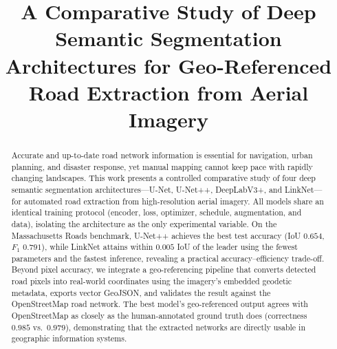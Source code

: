 \documentclass[conference]{IEEEtran}
\begin{document}
\newif\ifanon
\anontrue

\title{A Comparative Study of Deep Semantic Segmentation Architectures for
Geo-Referenced Road Extraction from Aerial Imagery}

\ifanon
\author{
}
\else
\author{
\IEEEauthorblockN{Abhinav Shukla}
\IEEEauthorblockA{\textit{Dept. of Computer Science and Engineering}\\
\textit{Amity School of Engineering and Technology}\\
\textit{Amity University Uttar Pradesh, Lucknow Campus, India}\\
abhinav24shukla08@gmail.com}
\and
\IEEEauthorblockN{Dr. Sachin Kumar}
\IEEEauthorblockA{\textit{Dept. of Computer Science and Engineering}\\
\textit{Amity School of Engineering and Technology}\\
\textit{Amity University Uttar Pradesh, Lucknow Campus, India}\\
skumar3@lko.amity.edu}
}
\fi

\maketitle

\begin{abstract}
Accurate and up-to-date road network information is essential for navigation,
urban planning, and disaster response, yet manual mapping cannot keep pace with
rapidly changing landscapes. This work presents a controlled comparative study
of four deep semantic segmentation architectures---U-Net, U-Net++, DeepLabV3+,
and LinkNet---for automated road extraction from high-resolution aerial
imagery. All models share an identical training protocol (encoder, loss,
optimizer, schedule, augmentation, and data), isolating the architecture as the
only experimental variable. On the Massachusetts Roads benchmark, U-Net++
achieves the best test accuracy (IoU $0.654$, $F_1$ $0.791$), while LinkNet
attains within $0.005$ IoU of the leader using the fewest parameters and the
fastest inference, revealing a practical accuracy--efficiency trade-off.
Beyond pixel accuracy, we integrate a geo-referencing pipeline that converts
detected road pixels into real-world coordinates using the imagery's embedded
geodetic metadata, exports vector GeoJSON, and validates the result against the
OpenStreetMap road network. The best model's geo-referenced output agrees with
OpenStreetMap as closely as the human-annotated ground truth does (correctness
$0.985$ vs.\ $0.979$), demonstrating that the extracted networks are directly
usable in geographic information systems.
\end{abstract}
\end{document}
